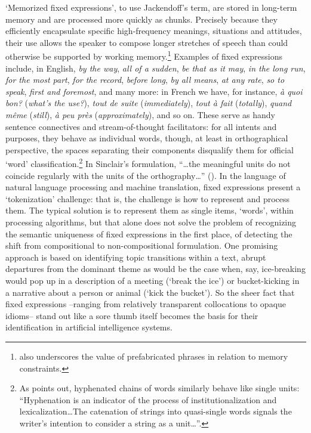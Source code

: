 \documentclass[output=paper]{langsci/langscibook}
\begin{document}
‘Memorized fixed expressions’, to use Jackendoff’s term, are stored in long-term memory and are processed more quickly as chunks. Precisely because they efficiently encapsulate specific high-frequency meanings, situations and attitudes, their use allows the speaker to compose longer stretches of speech than could otherwise be supported by working memory.\footnote{ \textrm{\citet{bolinger_meaning_1976} also underscores the value of prefabricated phrases in relation to memory constraints.}} Examples of fixed expressions include, in English, \textit{by the way}, \textit{all of a sudden}, \textit{be that as it may}, \textit{in the long run}, \textit{for the most part}, \textit{for the record}, \textit{before long}, \textit{by all means}, \textit{at any rate}, \textit{so to speak}, \textit{first and foremost}, and many more: in French we have, for instance, \textit{à quoi bon?} (\textit{what’s the use?}), \textit{tout de suite} (\textit{immediately}), \textit{tout à fait} (\textit{totally}), \textit{quand même} (\textit{still}), \textit{à peu près} (\textit{approximately}), and so on. These serve as handy sentence connectives and stream-of-thought facilitators: for all intents and purposes, they behave as individual words, though, at least in orthographical perspective, the spaces separating their components disqualify them for official ‘word’ classification.\footnote{ \textrm{As \citet[43]{moon_fixed_1998} points out, hyphenated chains of words similarly behave like single units: “Hyphenation is an indicator of the process of institutionalization and lexicalization…The catenation of strings into quasi-single words signals the writer’s intention to consider a string as a unit…”.}} In Sinclair’s formulation, “…the meaningful units do not coincide regularly with the units of the orthography…” (\citeyear[410]{granger_phrase_2008}). In the language of natural language processing and machine translation, fixed expressions present a ‘tokenization’ challenge: that is, the challenge is how to represent and process them. The typical solution is to represent them as single items, ‘words’, within processing algorithms, but that alone does not solve the problem of recognizing the semantic uniqueness of fixed expressions in the first place, of detecting the shift from compositional to non-compositional formulation. One promising approach is based on identifying topic transitions within a text, abrupt departures from the dominant theme as would be the case when, say, ice-breaking would pop up in a description of a meeting (‘break the ice’) or bucket-kicking in a narrative about a person or animal (‘kick the bucket’). So the sheer fact that fixed expressions –ranging from relatively transparent collocations to opaque idioms– stand out like a sore thumb itself becomes the basis for their identification in artificial intelligence systems.
\end{document}
